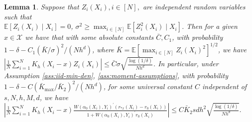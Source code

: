 \documentclass[11pt]{article}
\newtheorem{lemma}{Lemma}
\begin{document}
\begin{lemma}\label{lemma:covariate:score*approx}
Suppose that $Z_i(X_i), i\in [N],$ are independent random variables such that \\
$\mathbb{E}[Z_i(X_i)\mid X_i]=0$,  $\sigma^2 \geq \max_{i\in[N]}\mathbb{E}[Z_i^2(X_i) \mid X_i]$. Then for a given $x\in \mathcal{X}$ we have that with some absolute constants $\bar{C},C_1$, with probability $1-\delta-C_1(\bar{K}/\sigma)^2/(Nh^d)$, where $\bar{K}=\mathbb{E}[\max_{i\in[N]}Z_i(X_i)^2]^{1/2}$, we have $\left|\frac{1}{N}\sum_{i=1}^N K_h(X_i-x) Z_i(X_i) \right|\leq\bar{C}\sigma\sqrt{\frac{\log(1/\delta)}{Nh^d}}$. In particular, under Assumption \ref{ass:iid-min-den}, \ref{ass:moment-assumptions}, with probability $\displaystyle1-\delta-C(\bar{K}_{\max}/\bar{K}_2)^2/(Nh^d)$, for some universal constant $C$ independent of $s,N,h,M,d$, we have $\displaystyle\left|\frac{1}{N}\sum_{i=1}^N K_h(X_i-x)\frac{ W(\alpha_0(X_i),Y_i)^\prime(r_{*x}(X_i)-r_0(X_i))}{1+W(\alpha_0(X_i),Y_i)^\prime r_0(X_i)}\right| \leq C \bar{K}_2sdh^2\sqrt{\frac{\log(1/\delta)}{Nh^d}}$.
\end{lemma}
\end{document}
